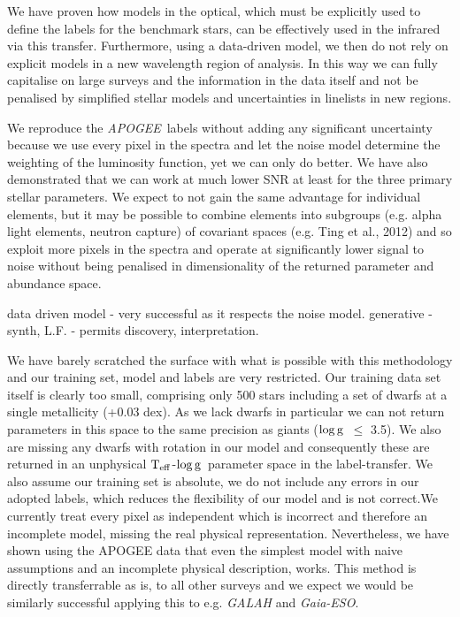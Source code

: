 \documentclass[12pt, preprint]{aastex}
\newcommand{\teff}{\mbox{$\rm T_{eff}$}}
\newcommand{\logg}{\mbox{$\rm \log g$}}
\newcommand{\apogee}{\textsl{APOGEE}}
\newcommand{\gaiaeso}{\textsl{Gaia-ESO}}
\begin{document}
We have  proven how models in the optical, which must be explicitly used to define the labels for the benchmark stars,  can be effectively used in the infrared via this transfer. Furthermore, using a data-driven model, we then do not rely on explicit models in a new wavelength region of analysis. In this way we can fully capitalise on large surveys and the information in the data itself and not be penalised by simplified stellar models and uncertainties in linelists in new regions. 

We reproduce the \apogee\ labels without adding any significant uncertainty because we use every pixel in the spectra and let the noise model determine the weighting of the luminosity function, yet we can only do better. We have also demonstrated that we can work at much lower SNR at least for the three primary stellar parameters. We expect to not gain the same advantage for individual elements, but it may be possible to combine elements into subgroups (e.g. alpha light elements, neutron capture) of covariant spaces (e.g. Ting et al., 2012) and so exploit more pixels in the spectra and operate at significantly lower signal to noise without being penalised in dimensionality of the returned parameter and abundance space. 

data driven model -  very successful as it respects the noise model. generative - synth, L.F. - permits discovery, interpretation.

We have barely scratched the surface with what is possible with this methodology and our training set, model and labels are very restricted. Our training data set itself is clearly too small, comprising only 500 stars including a set of dwarfs at a single metallicity (+0.03 dex). As we lack dwarfs in particular we can not return parameters in this space to the same precision as giants (\logg\ $\le$ 3.5).  We also are missing any dwarfs with rotation in our model and consequently these are returned in an unphysical \teff-\logg\ parameter space in the label-transfer. We also assume our training set is absolute, we do not include any errors in our adopted labels, which reduces the flexibility of our model and is not correct.We currently treat every pixel as independent which is incorrect and therefore an incomplete model, missing the real physical representation. Nevertheless, we have shown using the APOGEE data that even the simplest model with naive assumptions and an incomplete physical description, works. This method is directly transferrable as is, to all other surveys and we expect we would be similarly successful applying this to e.g. \textit{GALAH} and \gaiaeso.
\end{document}
